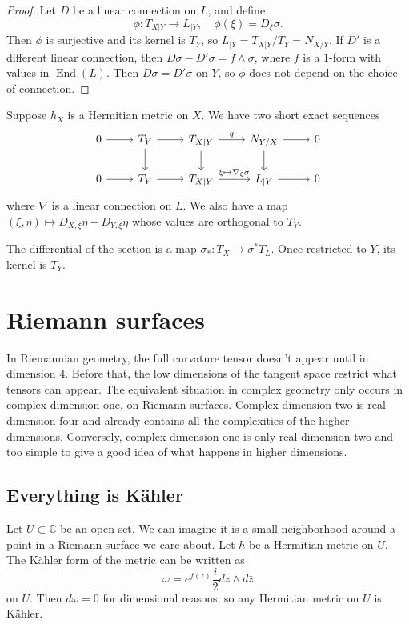 \documentclass[11pt]{article}
\newtheorem*{proof}{Proof}
\newcommand{\kk}[1]{\mathbb{#1}}
\DeclareMathOperator{\End}{End}
\begin{document}
\begin{proof}
Let $D$ be a linear connection on $L$, and define
\[
\phi : T_{X|Y} \to L_{|Y},
\quad
\phi(\xi) = D_\xi \sigma.
\]
Then $\phi$ is surjective and its kernel is $T_Y$, so $L_{|Y} = T_{X|Y} / T_Y = N_{X/Y}$. If $D'$ is a different linear connection, then $D\sigma - D'\sigma = f \wedge \sigma$, where $f$ is a $1$-form with values in $\End(L)$. Then $D\sigma = D'\sigma$ on $Y$, so $\phi$ does not depend on the choice of connection.
\end{proof}

Suppose $h_X$ is a Hermitian metric on $X$. We have two short exact sequences
\[
\begin{tikzcd}
0 \ar[r] & T_Y \ar[r]\ar[d] & T_{X|Y} \ar[d] \ar[r,"q"] & N_{Y/X} \ar[r] \ar[d] & 0
\\
0 \ar[r] & T_Y \ar[r] & T_{X|Y} \ar[r,"\xi \mapsto \nabla_\xi\sigma"] & L_{|Y} \ar[r] & 0
\end{tikzcd}
\]
where $\nabla$ is a linear connection on $L$. We also have a map $(\xi,\eta) \mapsto D_{X,\xi}\eta - D_{Y,\xi}\eta$ whose values are orthogonal to $T_Y$.

The differential of the section is a map $\sigma_* : T_X \to \sigma^* T_L$. Once restricted to $Y$, its kernel is $T_Y$.



\section{Riemann surfaces}
\label{sec:org776713b}

In Riemannian geometry, the full curvature tensor doesn't appear until in dimension $4$. Before that, the low dimensions of the tangent space restrict what tensors can appear. The equivalent situation in complex geometry only occurs in complex dimension one, on Riemann surfaces. Complex dimension two is real dimension four and already contains all the complexities of the higher dimensions. Conversely, complex dimension one is only real dimension two and too simple to give a good idea of what happens in higher dimensions.

\subsection{Everything is K\"ahler}
Let $U \subset \kk C$ be an open set. We can imagine it is a small neighborhood around a point in a Riemann surface we care about. Let $h$ be a Hermitian metric on $U$. The K\"ahler form of the metric can be written as
$$
\omega = e^{f(z)} \frac{i}{2} dz \wedge d\bar z
$$
on $U$. Then $d\omega = 0$ for dimensional reasons, so any Hermitian metric on $U$ is K\"ahler.
\end{document}
